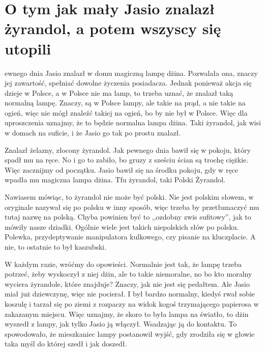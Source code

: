 \chapter{O tym jak mały Jasio znalazł żyrandol, a potem wszyscy się utopili}


ewnego dnia Jasio znalazł w domu magiczną lampę dżina.
Pozwalała ona, znaczy jej zawartość, spełniać dowolne życzenia posiadacza.
Jednak ponieważ akcja się dzieje w Polsce, a w Polsce nie ma lamp, to trzeba uznać, że znalazł taką normalną lampę.
Znaczy, są w Polsce lampy, ale takie na prąd, a nie takie na ogień, więc nie mógł znaleźć takiej na ogień, bo by nie był w Polsce.
Więc dla uproszczenia uznajmy, że to będzie normalna lampa dżina. Taki żyrandol, jak wisi w domach na suficie, i że Jasio go tak po prostu znalazł. 

Znalazł żelazny, złocony żyrandol. Jak pewnego dnia bawił się w pokoju, który spadł mu na ręce.
No i go to zabiło, bo gruzy z sześciu ścian są trochę ciężkie. Więc zacznijmy od początku.
Jasio bawił się na środku pokoju, gdy w ręce wpadła mu magiczna lampa dżina. Tfu żyrandol, taki Polski Żyrandol.

Nawiasem mówiąc, to żyrandol nie może być polski.
Nie jest polskim słowem, w oryginale nazywał się po polsku w inny sposób, więc trzeba by przetłumaczyć mu tutaj nazwę na polską.
Chyba powinien być to ,,ozdobny zwis sufitowy'', jak to mówiły nasze dziadki.
Ogólnie wiele jest takich niepolskich słów po polsku. Polewka, przydeptywanie manipulatora kulkowego, czy pisanie na kluczplacie.
A nie, to ostatnie to był kaszubski.

W każdym razie, wróćmy do opowieści.
Normalnie jest tak, że lampę trzeba potrzeć, żeby wyskoczył z niej dżin, ale to takie niemoralne, no bo kto moralny wyciera żyrandole, które znajduje?
Znaczy, jak nie jest się pedałtem. Ale Jasio miał już dziewczynę, więc nie pocierał.
I był bardzo normalny, kiedyś rwał sobie koszulę i tarzał się po ziemi z rozpaczy na widok kogoś trzymającego papierosa w zakazanym miejscu.
Więc uznajmy, że skoro to była lampa na światło, to dżin wyszedł z lampy, jak tylko Jasio ją włączył. Wsadzając ją do kontaktu.
To spowodowało, że mieszkaniec lampy postanowił wyjść, gdy zrodziła się w głowie taka myśl do której szedł i jak doszedł.

